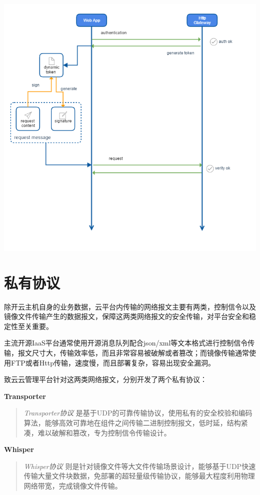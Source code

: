 \documentclass[letterpaper,10pt]{sphinxmanual}
\begin{document}
\includegraphics{5_2_restful_api.png}


\section{私有协议}
\label{index:id25}
除开云主机自身的业务数据，云平台内传输的网络报文主要有两类，控制信令以及镜像文件传输产生的数据报文，保障这两类网络报文的安全传输，对平台安全和稳定性至关重要。

主流开源IaaS平台通常使用开源消息队列配合json/xml等文本格式进行控制信令传输，报文尺寸大，传输效率低，而且非常容易被破解或者篡改；而镜像传输通常使用FTP或者Http传输，速度慢，而且部署复杂，容易出现安全漏洞。

致云云管理平台针对这两类网络报文，分别开发了两个私有协议：

\textbf{Transporter}
\begin{quote}

\emph{Transporter协议} 是基于UDP的可靠传输协议，使用私有的安全校验和编码算法，能够高效可靠地在组件之间传输二进制控制报文，低时延，结构紧凑，难以破解和篡改，专为控制信令传输设计。
\end{quote}

\textbf{Whisper}
\begin{quote}

\emph{Whisper协议} 则是针对镜像文件等大文件传输场景设计，能够基于UDP快速传输大量文件块数据，免部署的超轻量级传输协议，能够最大程度利用物理网络带宽，完成镜像文件传输。
\end{quote}
\end{document}
